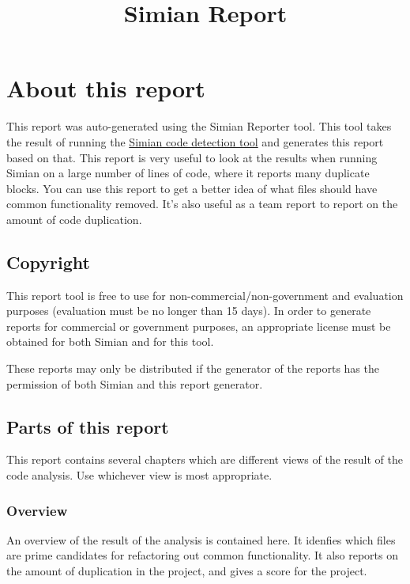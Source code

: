 \documentclass{report}[10pt]
\title{Simian Report}
\begin{document}
\maketitle

\tableofcontents


\chapter{About this report}

This report was auto-generated using the Simian Reporter tool. This tool takes the result of running the \href{http://www.harukizaemon.com/simian/index.html}{Simian code detection tool} and generates this report based on that. This report is very useful to look at the results when running Simian on a large number of lines of code, where it reports many duplicate blocks. You can use this report to get a better idea of what files should have common functionality removed. It's also useful as a team report to report on the amount of code duplication.

\section{Copyright}

This report tool is free to use for non-commercial/non-government and evaluation purposes (evaluation must be no longer than 15 days). In order to generate reports for commercial or government purposes, an appropriate license must be obtained for both Simian and for this tool.

These reports may only be distributed if the generator of the reports has the permission of both Simian and this report generator.

\section{Parts of this report}

This report contains several chapters which are different views of the result of the code analysis. Use whichever view is most appropriate.

\subsection{Overview}

An overview of the result of the analysis is contained here. It idenfies which files are prime candidates for refactoring out common functionality. It also reports on the amount of duplication in the project, and gives a score for the project.
\end{document}
